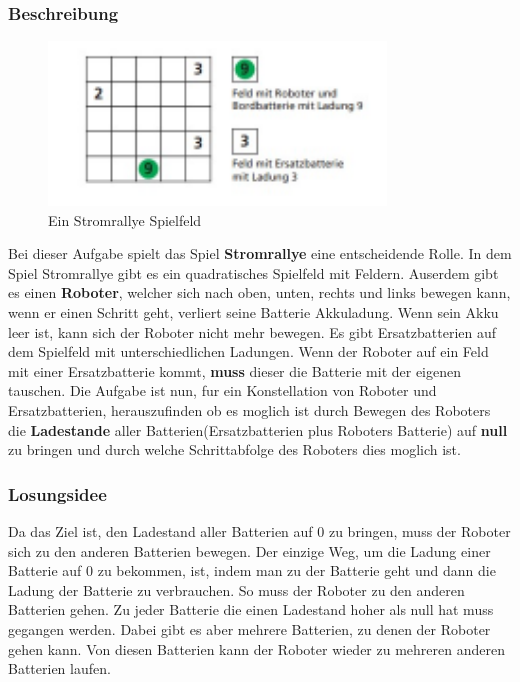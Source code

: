 \documentclass[a4paper,12pt,arial]{scrartcl}
\begin{document}
\subsubsection{Beschreibung}
\begin{figure}[h]
    \centering
    \includegraphics[width=0.8\textwidth]{Stromrallye_Feld.pdf}
    
    \caption{Ein Stromrallye Spielfeld
    \textit{\textcite{bwinfSpielfeld}
    }}
    \label{fig:stromrallye_spiel}
\end{figure}
\par
Bei dieser Aufgabe spielt das Spiel \textbf{Stromrallye} eine entscheidende Rolle.
In dem Spiel Stromrallye gibt es ein quadratisches Spielfeld mit Feldern.
Auserdem gibt es einen \textbf{Roboter}, welcher sich nach oben, unten, rechts und links bewegen kann, wenn er einen Schritt geht, verliert seine Batterie Akkuladung.
Wenn sein Akku leer ist, kann sich der Roboter nicht mehr bewegen.
Es gibt Ersatzbatterien auf dem Spielfeld mit unterschiedlichen Ladungen.
Wenn der Roboter auf ein Feld mit einer Ersatzbatterie kommt, \textbf{muss} dieser die Batterie mit der eigenen tauschen.
Die Aufgabe ist nun, fur ein Konstellation von Roboter und Ersatzbatterien, herauszufinden ob es moglich ist durch Bewegen des Roboters die \textbf{Ladestande} aller Batterien(Ersatzbatterien plus Roboters Batterie) auf \textbf{null} zu bringen und durch welche Schrittabfolge des Roboters dies moglich ist.
\textit{\textcite{bwinfSpielfeld}}
\subsubsection{Losungsidee}
Da das Ziel ist, den Ladestand aller Batterien auf 0 zu bringen, muss der Roboter sich zu den anderen Batterien bewegen.
Der einzige Weg, um die Ladung einer Batterie auf 0 zu bekommen, ist, indem man zu der Batterie geht und dann die Ladung der Batterie zu verbrauchen.
So muss der Roboter zu den anderen Batterien gehen. Zu jeder Batterie  die einen Ladestand hoher als null hat muss gegangen werden.
Dabei gibt es aber mehrere Batterien, zu denen der Roboter gehen kann.
Von diesen Batterien kann der Roboter wieder zu mehreren anderen Batterien laufen.
\par
\end{document}
